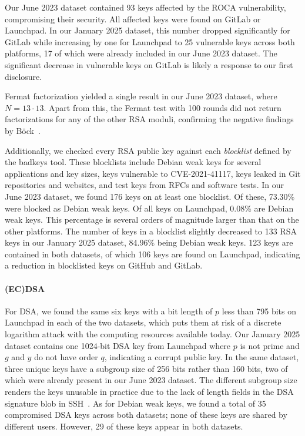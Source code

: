 Our June 2023 dataset contained 93 keys affected by the ROCA vulnerability, compromising their security. All affected keys were found on GitLab or Launchpad. In our January 2025 dataset, this number dropped significantly for GitLab while increasing by one for Launchpad to 25 vulnerable keys across both platforms, 17 of which were already included in our June 2023 dataset. The significant decrease in vulnerable keys on GitLab is likely a response to our first disclosure.

Fermat factorization yielded a single result in our June 2023 dataset, where $N = 13\cdot 13$. Apart from this, the Fermat test with 100 rounds did not return factorizations for any of the other RSA moduli, confirming the negative findings by Böck~\cite{EPRINT:Bock23}.

Additionally, we checked every RSA public key against each \emph{blocklist} defined by the badkeys tool. These blocklists include Debian weak keys for several applications and key sizes, keys vulnerable to CVE-2021-41117, keys leaked in Git repositories and websites, and test keys from RFCs and software tests.
In our June 2023 dataset, we found 176 keys on at least one blocklist. Of these, 73.30\% were blocked as Debian weak keys. Of all keys on Launchpad, 0.08\% are Debian weak keys. This percentage is several orders of magnitude larger than that on the other platforms. The number of keys in a blocklist slightly decreased to 133 RSA keys in our January 2025 dataset, 84.96\% being Debian weak keys. 123 keys are contained in both datasets, of which 106 keys are found on Launchpad, indicating a reduction in blocklisted keys on GitHub and GitLab.


\paragraph{(EC)DSA}

For DSA, we found the same six keys with a bit length of $p$ less than 795 bits on Launchpad in each of the two datasets, which puts them at risk of a discrete logarithm attack with the computing resources available today. Our January 2025 dataset contains one 1024-bit DSA key from Launchpad where $p$ is not prime and $g$ and $y$ do not have order $q$, indicating a corrupt public key. In the same dataset, three unique keys have a subgroup size of 256 bits rather than 160 bits, two of which were already present in our June 2023 dataset. The different subgroup size renders the keys unusable in practice due to the lack of length fields in the DSA signature blob in SSH~\cite[Section 6.6]{rfc4253}. As for Debian weak keys, we found a total of 35 compromised DSA keys across both datasets; none of these keys are shared by different users. However, 29 of these keys appear in both datasets.

